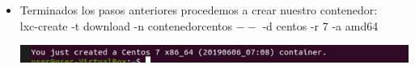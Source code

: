 \documentclass[a4paper, 11pt, oneside]{article}
\begin{document}
\begin{itemize}
\begin{itemize}
\begin{center}
    \end{center}
    \item Terminados los pasos anteriores procedemos a crear nuestro contenedor:\\
    lxc-create -t download -n contenedorcentos $--$ -d centos -r 7 -a amd64
    \begin{center}
        \includegraphics[scale=0.35]{contenedor.png}
    \end{center}
    \end{itemize}
    
\end{itemize}
\end{document}
